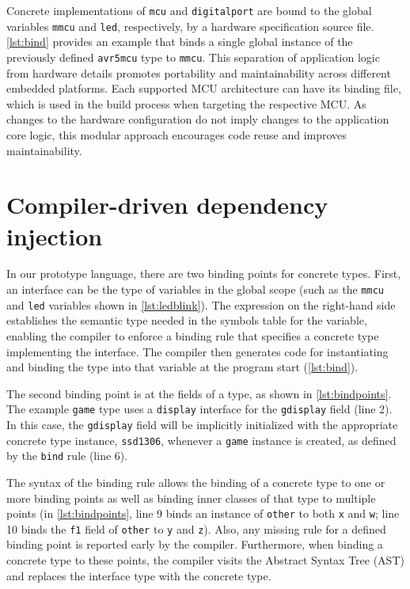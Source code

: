 \documentclass[sigconf]{acmart}
\begin{document}
Concrete implementations of {\tt mcu} and {\tt digitalport} are bound to the global variables {\tt mmcu} and {\tt led}, respectively, by a hardware specification source file. \autoref{lst:bind} provides an example that binds a single global instance of the previously defined {\tt avr5mcu} type to {\tt mmcu}. This separation of application logic from hardware details promotes portability and maintainability across different embedded platforms. Each supported MCU architecture can have its binding file, which is used in the build process when targeting the respective MCU. As changes to the hardware configuration do not imply changes to the application core logic, this modular approach encourages code reuse and improves maintainability.



\section{Compiler-driven dependency injection} \label{sec:design}

In our prototype language, there are two binding points for concrete types. First, an interface can be the type of variables in the global scope (such as the {\tt mmcu} and {\tt led} variables shown in \autoref{lst:ledblink}). The expression on the right-hand side establishes the semantic type needed in the symbols table for the variable, enabling the compiler to enforce a binding rule that specifies a concrete type implementing the interface. The compiler then generates code for instantiating and binding the type into that variable at the program start (\autoref{lst:bind}).

The second binding point is at the fields of a type, as shown in \autoref{lst:bindpoints}. The example {\tt game} type uses a {\tt display} interface for the {\tt gdisplay} field (line 2). In this case, the {\tt gdisplay} field will be implicitly initialized with the appropriate concrete type instance, {\tt ssd1306}, whenever a {\tt game} instance is created, as defined by the {\tt bind} rule (line 6). 

The syntax of the binding rule allows the binding of a concrete type to one or more binding points as well as binding inner classes of that type to multiple points (in \autoref{lst:bindpoints}, line 9 binds an instance of {\tt other} to both {\tt x} and {\tt w}; line 10 binds the {\tt f1} field of {\tt other} to {\tt y} and {\tt z}). Also, any missing rule for a defined binding point is reported early by the compiler. Furthermore, when binding a concrete type to these points, the compiler visits the Abstract Syntax Tree (AST) and replaces the interface type with the concrete type.
\end{document}
